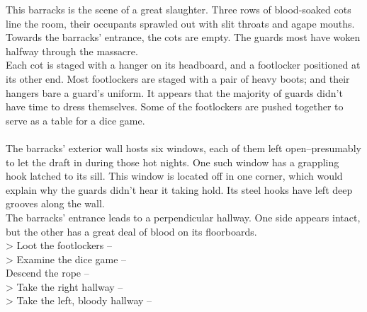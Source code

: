 This barracks is the scene of a great slaughter. Three rows of blood-soaked cots line the room, their occupants sprawled out with slit throats and agape mouths. Towards the barracks' entrance, the cots are empty. The guards most have woken halfway through the massacre.\\

Each cot is staged with a hanger on its headboard, and a footlocker positioned at its other end. Most footlockers are staged with a pair of heavy boots; and their hangers bare a guard's uniform. It appears that the majority of guards didn't have time to dress themselves. Some of the footlockers are pushed together to serve as a table for a dice game.\\
\\

The barracks' exterior wall hosts six windows, each of them left open--presumably to let the draft in during those hot nights. One such window has a grappling hook latched to its sill. This window is located off in one corner, which would explain why the guards didn't hear it taking hold. Its steel hooks have left deep grooves along the wall.\\

The barracks’ entrance leads to a perpendicular hallway. One side appears intact, but the other has a great deal of blood on its floorboards.\\

> Loot the footlockers -- \\
> Examine the dice game -- \\
 Descend the rope -- \\
> Take the right hallway -- \\
> Take the left, bloody hallway -- 